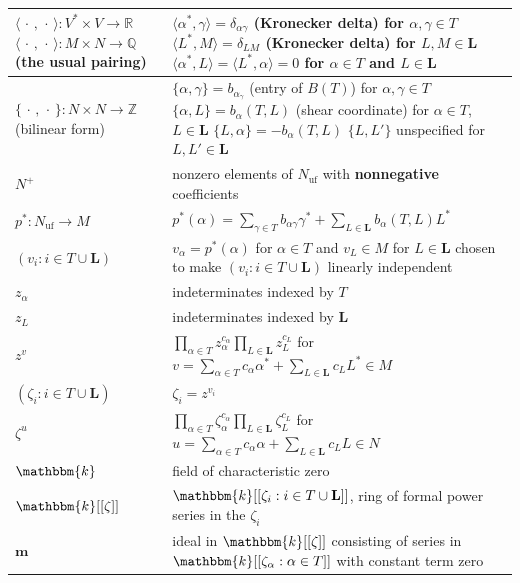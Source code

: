 \documentclass{amsart}
\theoremstyle{definition}
\theoremstyle{remark}
\numberwithin{equation}{section}
\newcommand{\integers}{\mathbb Z}
\newcommand{\rationals}{\mathbb Q}
\newcommand{\reals}{\mathbb R}
\newcommand{\uf}{{\operatorname{uf}}}
\newcommand{\set}[1]{{\lbrace #1 \rbrace}}
\newcommand{\br}[1]{{\langle #1 \rangle}}
\newcommand{\0}{{\mathbf{0}}}
\newcommand{\m}{\mathbf{m}}
\renewcommand{\k}{\mathbbm{k}}
\renewcommand{\L}{\mathbf{L}}
\begin{document}
\begin{longtable}{P{88.5pt}|P{248pt}}
$\br{\,\cdot\,,\,\cdot\,}:V^*\times V\to\reals$\linebreak
$\br{\,\cdot\,,\,\cdot\,}:M\times N\to\rationals$\linebreak
(the usual pairing)& 
$\br{\alpha^*,\gamma}=\delta_{\alpha\gamma}$ (Kronecker delta) for $\alpha,\gamma\in T$\linebreak
$\br{L^*,M}=\delta_{LM}$ (Kronecker delta) for $L,M\in\L$\linebreak
$\br{\alpha^*,L}=\br{L^*,\alpha}=0$ for $\alpha\in T$ and $L\in\L$
\\\hline
$\set{\,\cdot\,,\,\cdot\,}:N\times N\to\integers$\linebreak
(bilinear form)&$\set{\alpha,\gamma}=b_{\alpha_\gamma}$ (entry of $B(T)$) for $\alpha,\gamma\in T$\linebreak
$\set{\alpha,L}=b_\alpha(T,L)$ (shear coordinate) for $\alpha\in T$, $L\in\L$\linebreak
$\set{L,\alpha}=-b_\alpha(T,L)$\linebreak
$\set{L,L'}$ unspecified for $L,L'\in\L$
\\\hline
$N^+$& nonzero elements of $N_\uf$ with \textbf{nonnegative} coefficients\\\hline
$p^*:N_\uf\to M$&
$p^*(\alpha)=\sum_{\gamma\in T}b_{\alpha\gamma}\gamma^*+\sum_{L\in\L}b_\alpha(T,L)L^*$\\\hline
$(v_i:i\in T\cup\L)$&$v_\alpha=p^*(\alpha)$ for $\alpha\in T$ and
$v_L\in M$ for $L\in\L$ chosen to make $(v_i:i\in T\cup\L)$ linearly independent
\\\hline
$z_\alpha$&indeterminates indexed by $T$\\\hline
$z_L$&indeterminates indexed by $\L$\\\hline
$z^v$&$\displaystyle\prod_{\alpha\in T}z_\alpha^{c_\alpha}\prod_{L\in\L}z_L^{c_L}$ for $\displaystyle v=\sum_{\alpha\in T}c_\alpha\alpha^*+\sum_{L\in\L}c_LL^*\in M$\\\hline
$(\zeta_i:i\in T\cup\L)$&$\zeta_i=z^{v_i}$\\\hline
$\zeta^u$&$\displaystyle\prod_{\alpha\in T}\zeta_\alpha^{c_\alpha}\prod_{L\in\L}\zeta_L^{c_L}$ for $\displaystyle u=\sum_{\alpha\in T}c_\alpha\alpha+\sum_{L\in\L}c_LL\in N$\\\hline
$\k$&field of characteristic zero\\\hline
$\k[[\zeta]]$&$\k[[\zeta_i:i\in T\cup\L]]$, ring of formal power series in the $\zeta_i$\\\hline
$\m$&ideal in $\k[[\zeta]]$ consisting of series in $\k[[\zeta_\alpha:\alpha\in T]]$ with constant term zero\\\hline
\end{longtable}
\end{document}

